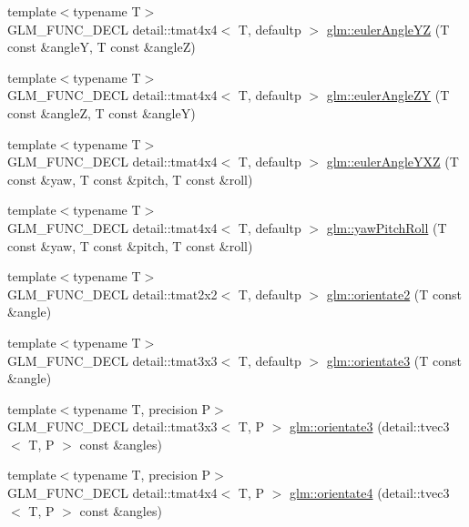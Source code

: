 \begin{CompactItemize}
\item 
{\footnotesize template$<$typename T$>$ }\\GLM\_\-FUNC\_\-DECL detail::tmat4x4$<$ T, defaultp $>$ \hyperlink{group__gtx__euler__angles_g9ac024a16439421d2a3c7c17b6df31b5}{glm::eulerAngleYZ} (T const \&angleY, T const \&angleZ)
\item 
{\footnotesize template$<$typename T$>$ }\\GLM\_\-FUNC\_\-DECL detail::tmat4x4$<$ T, defaultp $>$ \hyperlink{group__gtx__euler__angles_gfcd7d34bef520fd8bee6d4d865a8162a}{glm::eulerAngleZY} (T const \&angleZ, T const \&angleY)
\item 
{\footnotesize template$<$typename T$>$ }\\GLM\_\-FUNC\_\-DECL detail::tmat4x4$<$ T, defaultp $>$ \hyperlink{group__gtx__euler__angles_g7ba74fb9419dd90256b682855e904159}{glm::eulerAngleYXZ} (T const \&yaw, T const \&pitch, T const \&roll)
\item 
{\footnotesize template$<$typename T$>$ }\\GLM\_\-FUNC\_\-DECL detail::tmat4x4$<$ T, defaultp $>$ \hyperlink{group__gtx__euler__angles_ga254d26a7a42b65101f4eee88d5b153f}{glm::yawPitchRoll} (T const \&yaw, T const \&pitch, T const \&roll)
\item 
{\footnotesize template$<$typename T$>$ }\\GLM\_\-FUNC\_\-DECL detail::tmat2x2$<$ T, defaultp $>$ \hyperlink{group__gtx__euler__angles_g026f776506cd9c5b144c6d4b410a079b}{glm::orientate2} (T const \&angle)
\item 
{\footnotesize template$<$typename T$>$ }\\GLM\_\-FUNC\_\-DECL detail::tmat3x3$<$ T, defaultp $>$ \hyperlink{group__gtx__euler__angles_gce794db535af3056d97f4f62e7ed7509}{glm::orientate3} (T const \&angle)
\item 
{\footnotesize template$<$typename T, precision P$>$ }\\GLM\_\-FUNC\_\-DECL detail::tmat3x3$<$ T, P $>$ \hyperlink{group__gtx__euler__angles_g114ce533cc2f140cb17ca5a44214d973}{glm::orientate3} (detail::tvec3$<$ T, P $>$ const \&angles)
\item 
{\footnotesize template$<$typename T, precision P$>$ }\\GLM\_\-FUNC\_\-DECL detail::tmat4x4$<$ T, P $>$ \hyperlink{group__gtx__euler__angles_g98f6c8d3b6b97ff0ae2f64544142cb7f}{glm::orientate4} (detail::tvec3$<$ T, P $>$ const \&angles)
\end{CompactItemize}



